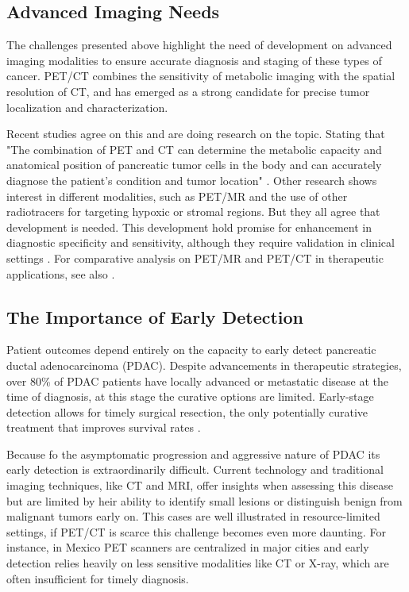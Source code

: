 \documentclass[11pt]{article} %
\begin{document}
\subsection{Advanced Imaging Needs}

The challenges presented above highlight the need of development on advanced imaging modalities to ensure accurate diagnosis and staging of these types of cancer. PET/CT combines the sensitivity of metabolic imaging with the spatial resolution of CT, and has emerged as a strong candidate for precise tumor localization and characterization.

Recent studies agree on this and are doing research on the topic. Stating that "The combination of PET and CT can determine the metabolic capacity and anatomical position of pancreatic tumor cells in the body and can accurately diagnose the patient's condition and tumor location" \cite{Pu2021}. Other research shows interest in different modalities, such as PET/MR and the use of other radiotracers for targeting hypoxic or stromal regions. But they all agree that development is needed. This development hold promise for enhancement in diagnostic specificity and sensitivity, although they require validation in clinical settings \cite{Cancers2023}. For comparative analysis on PET/MR and PET/CT in therapeutic applications, see also \cite{myownotherpaper}.

\subsection{The Importance of Early Detection}

Patient outcomes depend entirely on the capacity to early detect pancreatic ductal adenocarcinoma (PDAC). Despite advancements in therapeutic strategies, over 80\% of PDAC patients have locally advanced or metastatic disease at the time of diagnosis, at this stage the curative options are limited. Early-stage detection allows for timely surgical resection, the only potentially curative treatment that improves survival rates \cite{Cancers2023}. 

Because fo the asymptomatic progression and aggressive nature of PDAC its early detection is extraordinarily difficult. Current technology and traditional imaging techniques, like CT and MRI, offer insights when assessing this disease but are limited by heir ability to identify small lesions or distinguish benign from malignant tumors early on. This cases are well illustrated in resource-limited settings, if PET/CT is scarce this challenge becomes even more daunting. For instance, in Mexico PET scanners are centralized in major cities and early detection relies heavily on less sensitive modalities like CT or X-ray, which are often insufficient for timely diagnosis.
\end{document}
